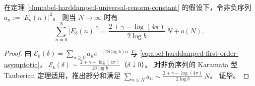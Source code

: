 \begin{corollary}[几何格点上误差的均方线性律]\label{cor:abel-tauberian-mean-square-linear-law}
在定理 \ref{thm:abel-harddamped-universal-renorm-constant} 的假设下，令非负序列 \(a_n:=|E_b(n)|^2\)。
则当 \(N\to\infty\) 时有
\[
\boxed{\;
\sum_{n=0}^{N} |E_b(n)|^2
=\frac{2+\gamma-\log(4\pi)}{2\log b}\,N+o(N).\;}
\]
\end{corollary}
\begin{proof}
由 \(\mathcal E_b(\delta)=\sum_{n\ge 0}a_n e^{-(2\delta\log b)n}\) 与 \eqref{eq:abel-harddamped-first-order-asymptotic}，
\(
\mathcal E_b(\delta)\sim \frac{2+\gamma-\log(4\pi)}{2\delta\log b}
\)（\(\delta\downarrow 0\)）。
对非负序列的 Karamata 型 Tauberian 定理适用，推出部分和满足
\(
\sum_{n\le N}a_n\sim \frac{2+\gamma-\log(4\pi)}{2\log b}\,N
\)。
证毕。
\end{proof}
